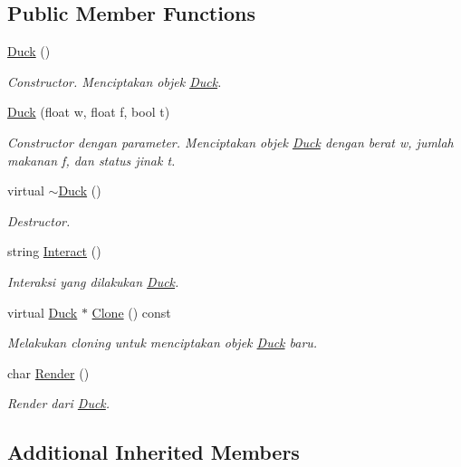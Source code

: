 \subsection*{Public Member Functions}
\begin{DoxyCompactItemize}
\item 
\hyperlink{classDuck_a65753b7b6eb80c4639f6bf165b8db9a6}{Duck} ()
\begin{DoxyCompactList}\small\item\em Constructor. Menciptakan objek \hyperlink{classDuck}{Duck}. \end{DoxyCompactList}\item 
\hyperlink{classDuck_ac66ea5a4f3b6555e818ff743005f1c38}{Duck} (float w, float f, bool t)
\begin{DoxyCompactList}\small\item\em Constructor dengan parameter. Menciptakan objek \hyperlink{classDuck}{Duck} dengan berat w, jumlah makanan f, dan status jinak t. \end{DoxyCompactList}\item 
virtual \hyperlink{classDuck_a073eb979ff45a938fde4cf769f5e579b}{$\sim$\+Duck} ()
\begin{DoxyCompactList}\small\item\em Destructor. \end{DoxyCompactList}\item 
string \hyperlink{classDuck_a9355aa821755703c02ac96e49692eaea}{Interact} ()
\begin{DoxyCompactList}\small\item\em Interaksi yang dilakukan \hyperlink{classDuck}{Duck}. \end{DoxyCompactList}\item 
virtual \hyperlink{classDuck}{Duck} $\ast$ \hyperlink{classDuck_ae3ff98b443c887f37ce63e3ed2e3a690}{Clone} () const 
\begin{DoxyCompactList}\small\item\em Melakukan cloning untuk menciptakan objek \hyperlink{classDuck}{Duck} baru. \end{DoxyCompactList}\item 
char \hyperlink{classDuck_a8453f95adcf2e7ff1b35a1a9d9948510}{Render} ()
\begin{DoxyCompactList}\small\item\em Render dari \hyperlink{classDuck}{Duck}. \end{DoxyCompactList}\end{DoxyCompactItemize}
\subsection*{Additional Inherited Members}


